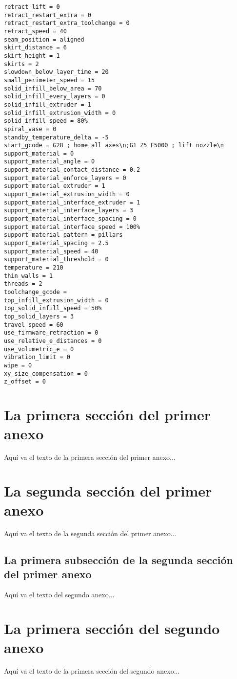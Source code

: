 \documentclass{iccmemoria}
\begin{document}
\begin{verbatim}
retract_lift = 0
retract_restart_extra = 0
retract_restart_extra_toolchange = 0
retract_speed = 40
seam_position = aligned
skirt_distance = 6
skirt_height = 1
skirts = 2
slowdown_below_layer_time = 20
small_perimeter_speed = 15
solid_infill_below_area = 70
solid_infill_every_layers = 0
solid_infill_extruder = 1
solid_infill_extrusion_width = 0
solid_infill_speed = 80%
spiral_vase = 0
standby_temperature_delta = -5
start_gcode = G28 ; home all axes\n;G1 Z5 F5000 ; lift nozzle\n
support_material = 0
support_material_angle = 0
support_material_contact_distance = 0.2
support_material_enforce_layers = 0
support_material_extruder = 1
support_material_extrusion_width = 0
support_material_interface_extruder = 1
support_material_interface_layers = 3
support_material_interface_spacing = 0
support_material_interface_speed = 100%
support_material_pattern = pillars
support_material_spacing = 2.5
support_material_speed = 40
support_material_threshold = 0
temperature = 210
thin_walls = 1
threads = 2
toolchange_gcode = 
top_infill_extrusion_width = 0
top_solid_infill_speed = 50%
top_solid_layers = 3
travel_speed = 60
use_firmware_retraction = 0
use_relative_e_distances = 0
use_volumetric_e = 0
vibration_limit = 0
wipe = 0
xy_size_compensation = 0
z_offset = 0
\end{verbatim}

\section{La primera sección del primer anexo}
Aquí va el texto de la primera sección del primer anexo...

\section{La segunda sección del primer anexo}
Aquí va el texto de la segunda sección del primer anexo...

\subsection{La primera subsección de la segunda sección del primer anexo}


Aquí va el texto del segundo anexo...

\section{La primera sección del segundo anexo}
Aquí va el texto de la primera sección del segundo anexo...

\end{document}
